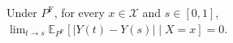 Under \(P^{\mathrm F}\), for every \(x\in\mathcal X\) and \(s\in[0,1]\), \(\lim_{t\to s}\mathbb E_{P^{\mathrm F}}[|Y(t)-Y(s)|\mid X=x]=0\).